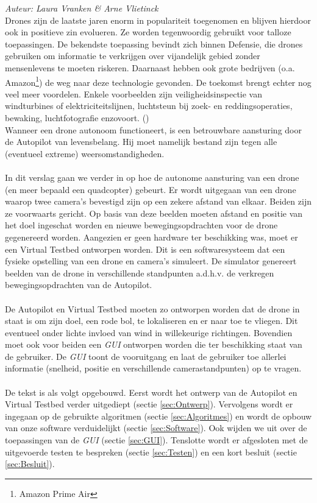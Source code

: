 {\em Auteur: Laura Vranken \& Arne Vlietinck}\\

\noindent
Drones zijn de laatste jaren enorm in populariteit toegenomen en blijven hierdoor ook in positieve zin evolueren. Ze worden tegenwoordig gebruikt voor talloze toepassingen. De bekendste toepassing bevindt zich binnen Defensie, die drones gebruiken om informatie te verkrijgen over vijandelijk gebied zonder mensenlevens te moeten riskeren. Daarnaast hebben ook grote bedrijven (o.a. Amazon\footnote{Amazon Prime Air}) de weg naar deze technologie gevonden. De toekomst brengt echter nog veel meer voordelen. Enkele voorbeelden zijn veiligheidsinspectie van windturbines of elektriciteitslijnen, luchtsteun bij zoek- en reddingsoperaties, bewaking, luchtfotografie enzovoort. (\cite{website:microdrones})
\\
Wanneer een drone autonoom functioneert, is een betrouwbare aansturing door de Autopilot van levensbelang. Hij moet namelijk bestand zijn tegen alle (eventueel extreme) weersomstandigheden.
\\
\\
In dit verslag gaan we verder in op hoe de autonome aansturing van een drone (en meer bepaald een quadcopter) gebeurt. Er wordt uitgegaan van een drone waarop twee camera's bevestigd zijn op een zekere afstand van elkaar. Beiden zijn ze voorwaarts gericht. Op basis van deze beelden moeten afstand en positie van het doel ingeschat worden en nieuwe bewegingsopdrachten voor de drone gegenereerd worden. Aangezien er geen hardware ter beschikking was, moet er een Virtual Testbed ontworpen worden. Dit is een softwaresysteem dat een fysieke opstelling van een drone en camera's simuleert. \cite{arcticle:opgavePeno} De simulator genereert beelden van de drone in verschillende standpunten a.d.h.v. de verkregen bewegingsopdrachten van de Autopilot. 
\\
\\
De Autopilot en Virtual Testbed moeten zo ontworpen worden dat de drone in staat is om zijn doel, een rode bol, te lokaliseren en er naar toe te vliegen. Dit eventueel onder lichte invloed van wind in willekeurige richtingen. Bovendien moet ook voor beiden een \textit{GUI} ontworpen worden die ter beschikking staat van de gebruiker. De \textit{GUI} toont de vooruitgang en laat de gebruiker toe allerlei informatie (snelheid, positie en verschillende camerastandpunten) op te vragen.
\\
\\
De tekst is als volgt opgebouwd. Eerst wordt het ontwerp van de Autopilot en Virtual Testbed verder uitgediept (sectie \ref{sec:Ontwerp}). Vervolgens wordt er ingegaan op de gebruikte algoritmen (sectie \ref{sec:Algoritmes}) en wordt de opbouw van onze software verduidelijkt (sectie \ref{sec:Software}). Ook wijden we uit over de toepassingen van de \textit{GUI} (sectie \ref{sec:GUI}). Tenslotte wordt er afgesloten met de uitgevoerde testen te bespreken (sectie \ref{sec:Testen}) en een kort besluit (sectie \ref{sec:Besluit}). \\